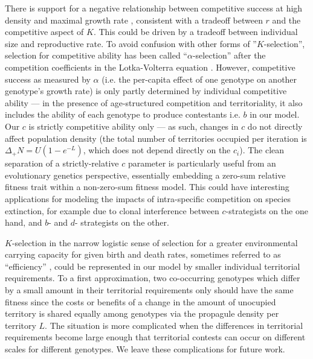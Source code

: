 \documentclass[11pt]{article}
\begin{document}
There is support for a negative relationship between competitive success at high density and maximal growth rate \citep{luckinbill_1979}, consistent with a tradeoff between $r$ and the competitive aspect of $K$. This could be driven by a tradeoff between individual size and reproductive rate. To avoid confusion with other forms of ''$K$-selection'', selection for competitive ability has been called ``$\alpha$-selection'' after the competition coefficients in the Lotka-Volterra equation \citep{gill_1974,case_1974,joshi_2001}. However, competitive success as measured by $\alpha$ (i.e. the per-capita effect of one genotype on another genotype's growth rate) is only partly determined by individual competitive ability --- in the presence of age-structured competition and territoriality, it also includes the ability of each genotype to produce contestants i.e. $b$ in our model. Our $c$ is strictly competitive ability only --- as such, changes in $c$ do not directly affect population density (the total number of territories occupied per iteration is $\Delta_+ N=U(1-e^{-L})$, which does not depend directly on the $c_i$). The clean separation of a strictly-relative $c$ parameter is particularly useful from an evolutionary genetics perspective, essentially embedding a zero-sum relative fitness trait within a non-zero-sum fitness model. This could have interesting applications for modeling the impacts of intra-specific competition on species extinction, for example due to clonal interference \citep{gerrish_1998,desai_2007} between $c$-strategists on the one hand, and $b$- and $d$- strategists on the other.

$K$-selection in the narrow logistic sense of selection for a greater environmental carrying capacity for given birth and death rates, sometimes referred to as ``efficiency'' \citep{macarthur_1967}, could be represented in our model by smaller individual territorial requirements. To a first approximation, two co-occurring genotypes which differ by a small amount in their territorial requirements only should have the same fitness since the costs or benefits of a change in the amount of unocupied territory is shared equally among genotypes via the propagule density per territory $L$. The situation is more complicated when the differences in territorial requirements become large enough that territorial contests can occur on different scales for different genotypes. We leave these complications for future work. 
\end{document}
